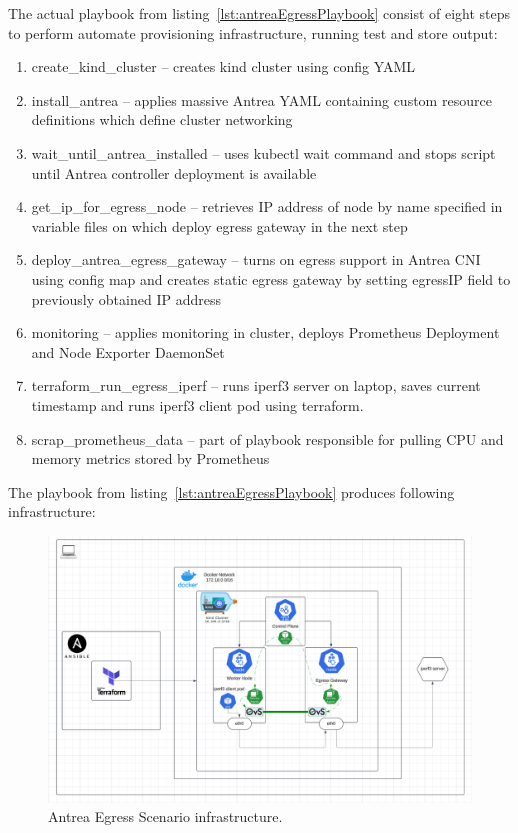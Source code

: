 The actual playbook from listing~\ref{lst:antreaEgressPlaybook} consist of eight steps to perform automate provisioning infrastructure, running test and store output:
\begin{enumerate}
  \item create\_kind\_cluster -- creates kind cluster using config YAML
  \item install\_antrea -- applies massive Antrea YAML containing custom resource definitions which define cluster networking 
  \item wait\_until\_antrea\_installed -- uses kubectl wait command and stops script until Antrea controller deployment is available
  \item get\_ip\_for\_egress\_node -- retrieves IP address of node by name specified in variable files on which deploy egress gateway in the next step 
  \item deploy\_antrea\_egress\_gateway -- turns on egress support in Antrea CNI using config map and creates static egress gateway by setting egressIP field to previously obtained IP address 
  \item monitoring -- applies monitoring in cluster, deploys Prometheus Deployment and Node Exporter DaemonSet
  \item terraform\_run\_egress\_iperf -- runs iperf3 server on laptop, saves current timestamp and runs iperf3 client pod using terraform.
  \item scrap\_prometheus\_data -- part of playbook responsible for pulling CPU and memory metrics stored by Prometheus
\end{enumerate}

The playbook from listing~\ref{lst:antreaEgressPlaybook} produces following infrastructure:

\begin{figure}[tbh]
  \centering
  \includegraphics[width=1\columnwidth]{images/antrea_egress_gatateway_cluster.png}
  \caption{Antrea Egress Scenario infrastructure.}
  \label{fig:antreaEgressScenarioArch}
\end{figure}

